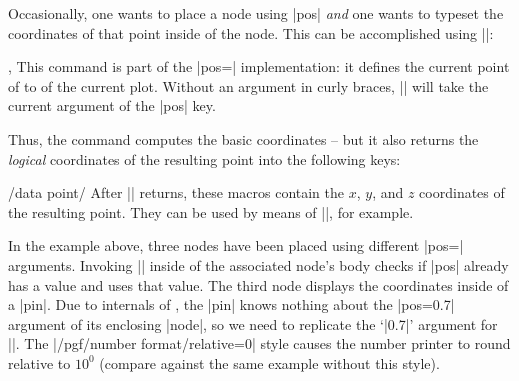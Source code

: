 {Occasionally, one wants to place a node using |pos| \emph{and} one wants to
typeset the coordinates of that point inside of the node. This can be
accomplished using |\pgfplotspointplotattime|:

\begin{commandlist}{\pgfplotspointplotattime,\pgfplotspointplotattime{}}
    This command is part of the |pos=| implementation: it
    defines the current point of \pgfname{} to  of the current
    plot. Without an argument in curly braces, |\pgfplotspointplotattime| will
    take the current argument of the |pos| key.

    Thus, the command computes the basic \pgfname{} coordinates -- but it also
    returns the \emph{logical} coordinates of the resulting point into the
    following keys:

    \begin{pgfplotsxykeylist}{/data point/\x}
        After |\pgfplotspointplotattime| returns, these macros contain the $x$,
        $y$, and $z$ coordinates of the resulting point. They can be used by
        means of ||, for example.
\begin{codeexample}[]
\end{codeexample}

        In the example above, three nodes have been placed using different
        |pos=| arguments. Invoking |\pgfplotspointplotattime| inside of the
        associated node's body checks if |pos| already has a value and uses
        that value. The third node displays the coordinates inside of a |pin|.
        Due to internals of \tikzname, the |pin| knows nothing about the
        |pos=0.7| argument of its enclosing |node|, so we need to replicate the
        `|0.7|' argument for ||. The
        |/pgf/number format/relative=0| style causes the number printer to
        round relative to $10^0$ (compare against the same example without this
        style).


\end{pgfplotsxykeylist}
\end{commandlist}}
